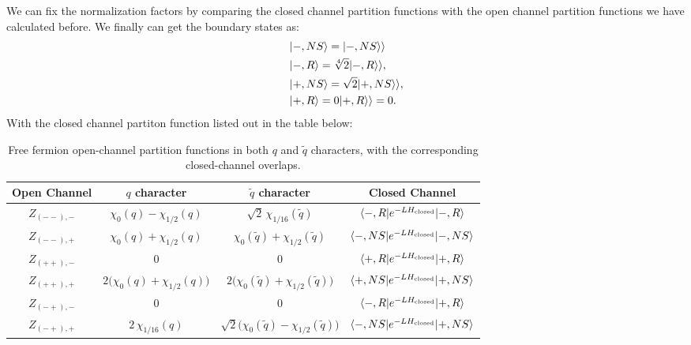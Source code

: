 We can fix the normalization factors by comparing the closed channel partition functions with the open channel partition functions we have calculated before. We finally can get the boundary states as:
\begin{align}
 & \ket{-,NS} = | -,NS\rangle\rangle\\ 
 &\ket{-,R} = \sqrt[4]{2}|-,R\rangle\rangle, \\ 
 & \ket{+,NS} = \sqrt{2}|+,NS\rangle\rangle, \\ 
 & \ket{+,R} = 0|+,R\rangle\rangle = 0.
\end{align}
With the closed channel partiton function listed out in the table below:
\begin{table}[H]
\centering
\renewcommand{\arraystretch}{1.6}
\begin{tabular}{cccc}
\hline\hline
Open Channel & $ q $ character & $ \tilde{q} $ character & Closed Channel \\ 
\hline\hline

$Z_{(--),-}$ 
& $\chi_0(q) - \chi_{1/2}(q)$
& $\sqrt{2}\,\chi_{1/16}(\tilde q)$
& $\langle -,R | e^{-L H_{\rm closed}} | -,R \rangle$
\\

$Z_{(--),+}$ 
& $\chi_0(q) + \chi_{1/2}(q)$
& $\chi_0(\tilde q) + \chi_{1/2}(\tilde q)$
& $\langle -,NS | e^{-L H_{\rm closed}} | -,NS \rangle$
\\

$Z_{(++),-}$ 
& 0
& 0
& $\langle +,R | e^{-L H_{\rm closed}} | +,R \rangle$
\\

$Z_{(++),+}$ 
& $2\big(\chi_0(q) + \chi_{1/2}(q)\big)$
& $2\big(\chi_0(\tilde{q}) + \chi_{1/2}(\tilde{q})\big)$
& $\langle +,NS | e^{-L H_{\rm closed}} | +,NS \rangle$
\\

$Z_{(-+),-}$ 
& 0
& 0
& $\langle -,R | e^{-L H_{\rm closed}} | +,R \rangle$
\\

$Z_{(-+),+}$ 
& $2\,\chi_{1/16}(q)$
& $\sqrt{2}\big(\chi_0(\tilde q) - \chi_{1/2}(\tilde q)\big)$
& $\langle -,NS | e^{-L H_{\rm closed}} | +,NS \rangle$
\\

\hline\hline
\end{tabular}
\caption{Free fermion open-channel partition functions in both $ q $ and $ \tilde{q} $ characters, with the corresponding closed-channel overlaps.}
\label{tab:open-closed-partition-single}
\end{table}



